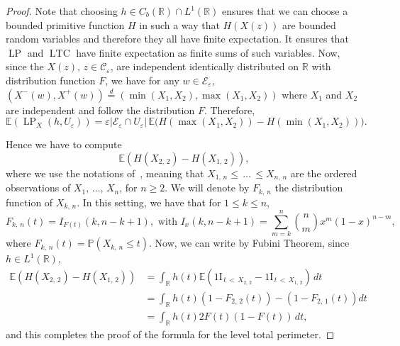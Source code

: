\documentclass[10pt]{amsart}
\theoremstyle{definition}\newtheorem{defi}[theo]{Definition}\newtheorem{rema}[theo]{Remark}\newtheorem{exam}[theo]{Example}\newtheorem{exem}[theo]{Example}\newtheorem{nota}[theo]{Notation}
\newcommand{\R}{\mathbb{R}}
\newcommand{\bbP}{\mathbb{P}}
\newcommand{\E}{\mathbb{E}}
\newcommand{\ind}{{1\!\!\mathrm{I}}}
\newcommand{\eps}{\varepsilon}
\DeclareMathOperator{\LTC}{LTC}
\DeclareMathOperator{\LP}{LP}
\newcommand{\calC}{\mathcal{C}}
\newcommand{\calE}{\mathcal{E}}
\begin{document}
\begin{proof}
Note that choosing $h \in C_b(\R)\cap L^1(\R)$ ensures that we can choose a bounded primitive function $H$ in such a way that $H(X(z))$ are
bounded random variables and therefore they all have finite expectation. It ensures that $\LP$ and $\LTC$ have finite expectation as finite sums of such variables. Now, since the $X(z)$, $z\in\calC_\eps$, are independent identically distributed on $\R$ with distribution function $F$, we have for any $w\in \calE_\eps$, $(X^-(w),X^+(w))\stackrel{d}{=}(\min(X_1,X_2),\max(X_1,X_2))$ where $X_1$ and $X_2$ are independent and follow the distribution $F$. Therefore,
\[
\E\left(\LP_X(h,U_\eps)\right) = \eps\left|\calE_\eps\cap U_\eps\right| \, \E\big(H\left(\max\left(X_1,X_2\right)\right) -
H\left(\min\left(X_1,X_2\right)\right)\big).
\]

Hence we have to compute
\[
\E\left(H(X_{2,\,2})-H(X_{1,\,2})\right),
\]
where we use the notations of~\cite{Nevzorov}, meaning that $X_{1,\,n}\le\,\ldots\,\le X_{n,\,n}$ are the ordered observations of $X_1,\,\ldots,\,X_n$, for $n\ge 2$. We will denote by $F_{k,\,n}$ the distribution function of $X_{k,\,n}$. In this setting, we have that for $1\le k\le n$,
\[
F_{k,\,n}(t)=I_{F(t)}(k,n-k+1), \text{ with } I_x(k,n-k+1)=\sum_{m=k}^n
\binom{n}{m}
x^m(1-x)^{n-m},
\]
where $F_{k,\,n}(t)=\bbP(X_{k,\,n}\le t)$. Now, we can write by Fubini Theorem, since $h\in L^1(\R)$,
\begin{align*}
\E\left(H(X_{2,\,2}) - H(X_{1,\,2})\right) & = \int_\R h(t) \E \left(
\ind_{\,t\,<\,X_{2,\,2}}-\ind_{\,t\,<\, X_{1,\,2}}\right) \, dt \\
& = \int_\R h(t) \left(1-F_{{2,\,2}}(t)\right)-\left(1-F_{{2,\,1}}(t)\right)dt\\
& = \int_\R h(t) 2 F (t) (1- F(t)) \, dt,
\end{align*}
and this completes the proof of the formula for the level total perimeter.


\end{proof}
\end{document}
